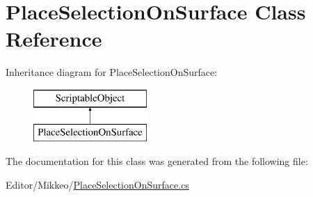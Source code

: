 \hypertarget{class_place_selection_on_surface}{}\section{Place\+Selection\+On\+Surface Class Reference}
\label{class_place_selection_on_surface}
Inheritance diagram for Place\+Selection\+On\+Surface\+:\begin{figure}[H]
\begin{center}
\leavevmode
\includegraphics[height=2.000000cm]{class_place_selection_on_surface}
\end{center}
\end{figure}


The documentation for this class was generated from the following file\+:\begin{DoxyCompactItemize}
\item 
Editor/\+Mikkeo/\hyperlink{_place_selection_on_surface_8cs}{Place\+Selection\+On\+Surface.\+cs}\end{DoxyCompactItemize}
